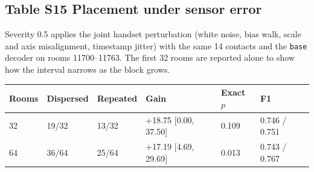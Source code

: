 \documentclass[10pt,letterpaper]{article}
\begin{document}
\begin{minipage}{\linewidth}\subsection*{Table S15 Placement under sensor error}
Severity 0.5 applies the joint handset perturbation (white noise, bias walk,
scale and axis misalignment, timestamp jitter) with the same 14 contacts and
the {\tt base} decoder on rooms 11700--11763. The first 32 rooms are reported
alone to show how the interval narrows as the block grows.

\begin{center}\small\begin{tabular}{@{}p{}p{}p{}p{}p{}p{}@{}}\toprule
\textbf{Rooms} & \textbf{Dispersed} & \textbf{Repeated} & \textbf{Gain} & \textbf{Exact $p$} & \textbf{F1} \\ \midrule
32 & 19/32 & 13/32 & +18.75 {[}0.00, 37.50{]} & 0.109 & 0.746 / 0.751 \\
64 & 36/64 & 25/64 & +17.19 {[}4.69, 29.69{]} & 0.013 & 0.743 / 0.767 \\
\end{tabular}\end{center}
\end{minipage}
\end{document}
